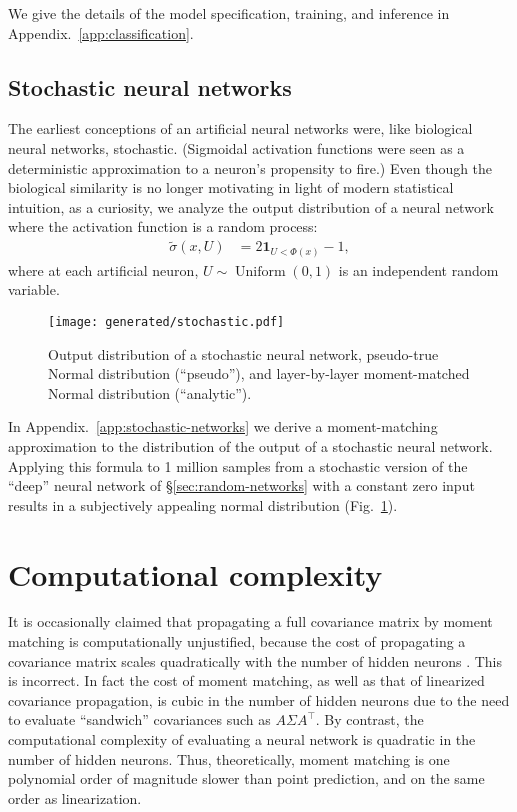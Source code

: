 \documentclass{article}
\begin{document}
We give the details of the model specification, training, and inference in Appendix.~\ref{app:classification}.


\subsection{Stochastic neural networks}
\label{sec:stochastic-networks}
The earliest conceptions of an artificial neural networks were, like biological neural networks, stochastic.
(Sigmoidal activation functions were seen as a deterministic approximation to a neuron's propensity to fire.)
Even though the biological similarity is no longer motivating in light of modern statistical intuition, as a curiosity, we analyze the output distribution of a neural network where the activation function is a random process:
\begin{align}
  \tilde \sigma(x, U) &= 2 \bm{1}_{U < \Phi(x)} - 1,
\end{align}
where at each artificial neuron, \(U \sim \operatorname{Uniform}(0,1)\) is an independent random variable.

\begin{figure}
  \begin{center}
    \texttt{[image: generated/stochastic.pdf]}
  \end{center}
  \caption{\label{fig:stochastic} Output distribution of a stochastic neural network, pseudo-true Normal distribution (``pseudo''), and layer-by-layer moment-matched Normal distribution (``analytic'').}
\end{figure}

In Appendix.~\ref{app:stochastic-networks} we derive a moment-matching approximation to the distribution of the output of a stochastic neural network.
Applying this formula to 1 million samples from a stochastic version of the ``deep'' neural network of \S\ref{sec:random-networks} with a constant zero input results in a subjectively appealing normal distribution (Fig.~\ref{fig:stochastic}).

\section{Computational complexity}
It is occasionally claimed that propagating a full covariance matrix by moment matching is computationally unjustified, because the cost of propagating a covariance matrix scales quadratically with the number of hidden neurons \citep[\S5]{akgul_deterministic_2025}.
This is incorrect.
In fact the cost of moment matching, as well as that of linearized covariance propagation, is cubic in the number of hidden neurons due to the need to evaluate ``sandwich'' covariances such as \(A \Sigma A^\intercal\).
By contrast, the computational complexity of evaluating a neural network is quadratic in the number of hidden neurons.
Thus, theoretically, moment matching is one polynomial order of  magnitude slower than point prediction, and on the same order as linearization.
\end{document}
